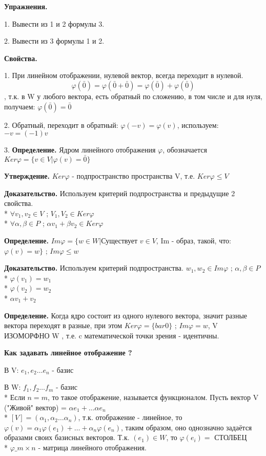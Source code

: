 \documentclass{article}
\begin{document}
{\bf Упражнения.}

1. Вывести из 1 и 2 формулы 3.

2. Вывести из 3 формулы 1 и 2.

{\bf Свойства.}

1. При линейном отображении, нулевой вектор, всегда переходит в нулевой.
$$\varphi(\bar{0})=\varphi(\bar{0}+\bar{0})=\varphi(\bar{0})+\varphi(\bar{0})$$,  т.к. в W у любого вектора, есть обратный по сложению, в том числе и для нуля, получаем: $\varphi(\bar{0})=\bar{0}$

2. Обратный, переходит в обратный: $\varphi(-v)=\varphi(v)$, используем: $-v=(-1)v$

3. {\bf Определение.} Ядром линейного отображения $\varphi$, обозначается $Ker\varphi=\{v \in V| \varphi(v)=\bar{0}\}$

{\bf Утверждение.} $Ker\varphi$ - подпространство пространства V, т.е. $Ker\varphi\le V$

{\bf Доказательство.} Используем критерий подпространства и предыдущие 2 свойства.\\*
$\forall v_1,v_2\in V $ ;     $ V_1, V_2\in Ker\varphi$\\*
$\forall \alpha,\beta\in P $ ;     $ \alpha v_1+\beta v_2\in Ker\varphi$

{\bf Определение.} $Im\varphi=\{w\in W|$Существует $v \in V$, Im - образ, такой, что: $\varphi(v)=w\} $ ; $ Im\varphi\le w$

{\bf Доказательство.} Используем критерий подпространства. $w_1, w_2 \in Im\varphi $ ; $ \alpha, \beta \in P$\\*
$\varphi(v_1)=w_1$\\*
$\varphi(v_2)=w_2$\\*
$\alpha v_1+ v_2$

{\bf Определение.} Когда ядро состоит из одного нулевого вектора, значит разные вектора переходят в разные, при этом $Ker\varphi=\{bar{0}\} $ ; $ Im\varphi=w $, V ИЗОМОРФНО W
, т.е. c математической точки зрения - идентичны.

{\bf Как задавать линейное отображение ?}

В V: $e_1, e_2\ldots e_n$ - базис

В W: $f_1, f_2\ldots f_m$ - базис\\*
Если $n=m$, то такое отображение, называется функционалом. Пусть вектор V ("Живой" вектор) = $\alpha e_1+\ldots \alpha e_n$\\*
$[V]=(\alpha_1,\alpha_2\ldots \alpha_n)$, т.к. отображение - линейное, то $\varphi(v)=\alpha_1\varphi(e_1)+\ldots+\alpha_n\varphi(e_n)$, таким образом, оно однозначно задаётся образами своих базисных векторов. Т.к. $(e_1)\in W$, то $\varphi(e_i)=$ СТОЛБЕЦ\\*
$\varphi\_{m\times n}$ - матрица линейного отображения.
\end{document}
